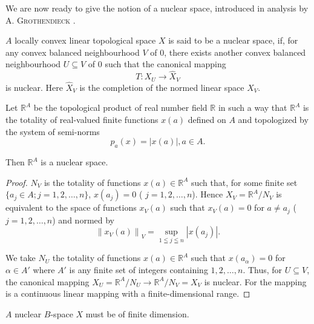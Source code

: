 We are now ready to give the notion of a nuclear space, introduced in analysis by A. \textsc{Grothendieck} \cite{grothendieck88}. 

\begin{definition}\label{def:AX.0.Definition.2} $A$ locally convex linear topological space $X$ is said to be a nuclear space, if, for any convex balanced neighbourhood $V$ of $0$, there exists another convex balanced neighbourhood $U \subseteq V$ of $0$ such that the canonical mapping 
\begin{equation}\label{eq:AX.0.4}
T \colon X _{U} \to \hat {X} _{V}
\end{equation}
is nuclear. Here $\hat{X}_{V}$ is the completion of the normed linear space $X_{V}$. 
\end{definition}

\begin{example}\label{ex:AX.0.Example.1} Let $\mathbb{R}^{A}$ be the topological product of real number field $\mathbb{R}$ in such a way that $\mathbb{R}^{A}$ is the totality of real-valued finite functions $x(a)$ defined on $A$ and topologized by the system of semi-norms 
\begin{equation}\label{eq:AX.0.5}
p_{a} (x) = | x (a) |, a \in A.
\end{equation}
\end{example}

Then $\mathbb{R}^{A}$ is a nuclear space. 

\begin{proof}
 $N_{V}$ is the totality of functions $x(a) \in \mathbb{R}^{A}$ such that, for some finite set $\{a_{j} \in A; j = 1, 2, \ldots, n\}$, $x(a_{j}) = 0$ ( $j = 1, 2, \ldots, n$). Hence $X_{V} = \mathbb{R}^{A}/N_{V}$ is equivalent to the space of functions $x_{V}(a)$ such that $x_{V}(a) = 0$ for $a \neq a_{j}$ ( $j = 1, 2, \ldots, n$) and normed by 
\[
\left\| x _{V} (a) \right\| _{V} = \sup\limits _{1 \leqq j \leqq n} | x (a _{j}) |. \]

We take $N_U$ the totality of functions $x(a) \in \mathbb{R}^{A}$ such that $x(a_\alpha) = 0$ for $\alpha \in A'$ where $A'$ is any finite set of integers containing $1, 2, \ldots, n$. Thus, for $U \subseteq V$, the canonical mapping $X_U = \mathbb{R}^{A} / N_U \to \mathbb{R}^{A} / N_V = X_V$ is nuclear. For the mapping is a continuous linear mapping with a finite-dimensional range. 
\end{proof}

\begin{example}\label{ex:AX.0.Example.2} $A$ nuclear $B$-space $X$ must be of finite dimension. 
\end{example}

